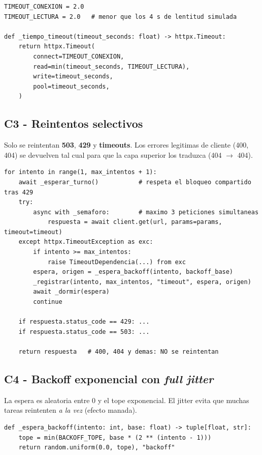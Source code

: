 \documentclass[11pt,a4paper]{article}
\begin{document}
\begin{lstlisting}[caption={Timeout separado conexion/lectura}]
TIMEOUT_CONEXION = 2.0
TIMEOUT_LECTURA = 2.0   # menor que los 4 s de lentitud simulada

def _tiempo_timeout(timeout_seconds: float) -> httpx.Timeout:
    return httpx.Timeout(
        connect=TIMEOUT_CONEXION,
        read=min(timeout_seconds, TIMEOUT_LECTURA),
        write=timeout_seconds,
        pool=timeout_seconds,
    )
\end{lstlisting}

\subsection{C3 - Reintentos selectivos}
Solo se reintentan \textbf{503}, \textbf{429} y \textbf{timeouts}. Los
errores legitimas de cliente (400, 404) se devuelven tal cual para que la
capa superior los traduzca (404 $\to$ 404).

\begin{lstlisting}[caption={Bucle de reintentos selectivos}]
for intento in range(1, max_intentos + 1):
    await _esperar_turno()           # respeta el bloqueo compartido tras 429
    try:
        async with _semaforo:        # maximo 3 peticiones simultaneas
            respuesta = await client.get(url, params=params, timeout=timeout)
    except httpx.TimeoutException as exc:
        if intento >= max_intentos:
            raise TimeoutDependencia(...) from exc
        espera, origen = _espera_backoff(intento, backoff_base)
        _registrar(intento, max_intentos, "timeout", espera, origen)
        await _dormir(espera)
        continue

    if respuesta.status_code == 429: ...
    if respuesta.status_code == 503: ...

    return respuesta   # 400, 404 y demas: NO se reintentan
\end{lstlisting}

\subsection{C4 - Backoff exponencial con \emph{full jitter}}
La espera es aleatoria entre 0 y el tope exponencial. El jitter evita que
muchas tareas reintenten \emph{a la vez} (efecto manada).

\begin{lstlisting}[caption={Calculo de la espera (full jitter)}]
def _espera_backoff(intento: int, base: float) -> tuple[float, str]:
    tope = min(BACKOFF_TOPE, base * (2 ** (intento - 1)))
    return random.uniform(0.0, tope), "backoff"
\end{lstlisting}
\end{document}
